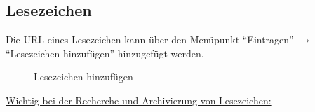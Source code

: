 \subsection{Lesezeichen} %
\label{subsec:lesezeichen}
Die URL eines Lesezeichen  kann über den Menüpunkt \enquote{Eintragen} $\to$ \enquote{Lesezeichen hinzufügen} hinzugefügt werden. 
\begin{figure}[h!]
 \centering
 \caption{Lesezeichen hinzufügen}
 \label{fig:lesezeichenHinzufuegen}
\end{figure}  
\underline{Wichtig bei der Recherche und Archivierung von Lesezeichen:}
